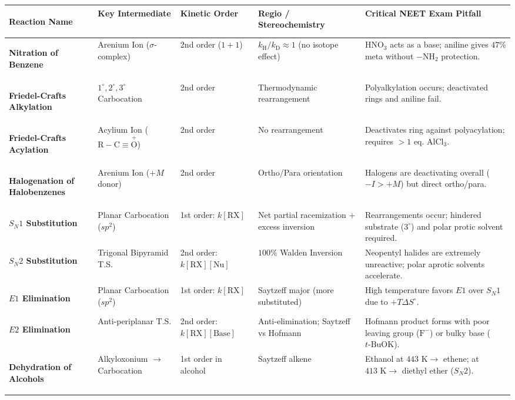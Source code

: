 \documentclass[10pt,a4paper]{article}
\begin{document}
\begin{center}
\scriptsize
\renewcommand{\arraystretch}{1.08}
\begin{tabularx}{\linewidth}{|>{\bfseries\raggedright\arraybackslash}p{2.2cm}|>{\raggedright\arraybackslash}p{2.4cm}|>{\raggedright\arraybackslash}p{1.6cm}|L|L|}
\hline
\textbf{Reaction Name} & \textbf{Key Intermediate} & \textbf{Kinetic Order} & \textbf{Regio / Stereochemistry} & \textbf{Critical NEET Exam Pitfall} \\
\hline
\textbf{Nitration of Benzene} & Arenium Ion ($\sigma$-complex) & 2nd order ($1+1$) & $k_{\mathrm{H}}/k_{\mathrm{D}} \approx 1$ (no isotope effect) & $\mathrm{HNO_3}$ acts as a base; aniline gives $47\%$ meta without $-\mathrm{NH_2}$ protection. \\
\hline
\textbf{Friedel-Crafts Alkylation} & $1^\circ, 2^\circ, 3^\circ$ Carbocation & 2nd order & Thermodynamic rearrangement & Polyalkylation occurs; deactivated rings and aniline fail. \\
\hline
\textbf{Friedel-Crafts Acylation} & Acylium Ion ($\mathrm{R-C\equiv \overset{+}{O}}$) & 2nd order & No rearrangement & Deactivates ring against polyacylation; requires $>1$ eq. $\mathrm{AlCl_3}$. \\
\hline
\textbf{Halogenation of Halobenzenes} & Arenium Ion ($+M$ donor) & 2nd order & Ortho/Para orientation & Halogens are deactivating overall ($-I > +M$) but direct ortho/para. \\
\hline
\textbf{$S_N1$ Substitution} & Planar Carbocation ($sp^2$) & 1st order: $k[\mathrm{RX}]$ & Net partial racemization $+$ excess inversion & Rearrangements occur; hindered substrate ($3^\circ$) and polar protic solvent required. \\
\hline
\textbf{$S_N2$ Substitution} & Trigonal Bipyramid T.S. & 2nd order: $k[\mathrm{RX}][\mathrm{Nu}]$ & $100\%$ Walden Inversion & Neopentyl halides are extremely unreactive; polar aprotic solvents accelerate. \\
\hline
\textbf{$E1$ Elimination} & Planar Carbocation ($sp^2$) & 1st order: $k[\mathrm{RX}]$ & Saytzeff major (more substituted) & High temperature favors $E1$ over $S_N1$ due to $+T\Delta S^\circ$. \\
\hline
\textbf{$E2$ Elimination} & Anti-periplanar T.S. & 2nd order: $k[\mathrm{RX}][\mathrm{Base}]$ & Anti-elimination; Saytzeff vs Hofmann & Hofmann product forms with poor leaving group ($\mathrm{F}^-$) or bulky base ($t\text{-BuOK}$). \\
\hline
\textbf{Dehydration of Alcohols} & Alkyloxonium $\to$ Carbocation & 1st order in alcohol & Saytzeff alkene & Ethanol at $443\text{ K} \to$ ethene; at $413\text{ K} \to$ diethyl ether ($S_N2$). \\

\end{tabularx}
\end{center}
\end{document}

